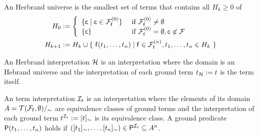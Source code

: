 \begin{definition}\label{def:hk}
	An {\myem Herbrand universe} is the smallest set of terms that contains all $H_k\ge 0$ of
	\begin{align*}
	H_0 &:= \left\{ 
	\begin{array}{ll}
	\{ \mc \mid \mc\in\mcFfn[0] \} 
	&\text{if } \mcFfn[0]\not=\emptyset\\
	\{ \mc \}
	&\text{if } \mcFfn[0]=\emptyset, \mc\not\in\mcF
	\end{array}
	\right. 
	\\
	H_{k+1} &:= H_k \cup \{\  
	\mf(t_1,\ldots,t_n) \mid
	\mf\in\mcFfn[n],
	t_1,\ldots,t_n \in H_k
	\ \}
	\end{align*}
	
\end{definition}

\begin{definition}
	An {\myem Herbrand interpretation} ${\mathcal H}$ is an interpretation where the domain 
	is an Hebrand universe
	and the interpretation of each ground term $t_{\mathcal H} := t$ is the term itself.
\end{definition}


\begin{definition}
	An {\myem term interpretation} 
	${\mathcal I}_t$ 
	is an interpretation 
	where the elements of its domain $A = {{\mathcal T}({\mathcal F}_{\mathsf f},\emptyset)}/_\sim$ 
		are equivalence classes of ground terms
		and the interpretation of each ground term $t^{{\mathcal I}_t} := [t]_\sim$ is its equivalence class.
	 A ground predicate ${\mathsf P}(t_1,\ldots,t_n)$ holds if 
	 $([t_1]_\sim,\ldots,[t_n]_\sim) \in {\mathsf P}^{{\mathcal I}_t} \subseteq A^n$.
	
\end{definition}


